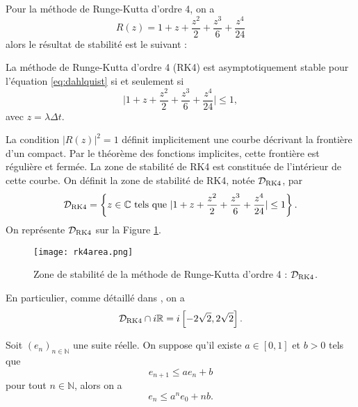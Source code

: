Pour la méthode de Runge-Kutta d'ordre 4, on a 
\begin{equation}
R(z) = 1 + z + \dfrac{z^2}{2} + \dfrac{z^3}{6} + \dfrac{z^4}{24} 
\label{eq:pol_RK4}
\end{equation}
alors le résultat de stabilité est le suivant :
\begin{proposition}
La méthode de Runge-Kutta d'ordre 4 (RK4) est asymptotiquement stable pour l'équation \eqref{eq:dahlquist} si et seulement si
\begin{equation}
\vert 1 + z + \dfrac{z^2}{2} + \dfrac{z^3}{6} + \dfrac{z^4}{24}  \vert \leq 1,
\end{equation}
avec $z = \lambda \Delta t$.
\label{prop:stab_rk4}
\end{proposition}
La condition $|R(z)|^2 = 1$ définit implicitement une courbe décrivant la frontière d'un compact. Par le théorème des fonctions implicites, cette frontière est régulière et fermée. La zone de stabilité de RK4 est constituée de l'intérieur de cette courbe.
On définit la zone de stabilité de RK4, notée $\mathcal{D}_{\RK4}$, par
\begin{equation}
\mathcal{D}_{\RK4} = \left\lbrace z \in \mathbb{C} \text{ tels que } \vert 1 + z + \dfrac{z^2}{2} + \dfrac{z^3}{6} + \dfrac{z^4}{24}  \vert \leq 1 \right\rbrace .
\end{equation} 
On représente $\mathcal{D}_{\RK4}$ sur la Figure \ref{fig:stab_area}.
\begin{figure}[htbp]
\begin{center}
\texttt{[image: rk4area.png]}
\end{center}
\caption{Zone de stabilité de la méthode de Runge-Kutta d'ordre 4 : $\mathcal{D}_{\RK4}$.}
\label{fig:stab_area}
\end{figure}

En particulier, comme détaillé dans \cite{Hundsdorfer2013}, on a
\begin{equation}
\mathcal{D}_{\RK4} \cap i \mathbb{R} = i \left[-2 \sqrt{2},2 \sqrt{2}\right].
\label{eq:DRK4UiR}
\end{equation}

\begin{lemme}
Soit $(e_n)_{n \in \mathbb{N}}$ une suite réelle. On suppose qu'il existe $a \in [0,1]$ et $b>0$ tels que
\begin{equation}
e_{n+1} \leq a e_n + b 
\end{equation}
pour tout $n \in \mathbb{N}$, alors on a
\begin{equation}
e_n \leq a^n e_0 + nb.
\end{equation}
\label{lem:gronwall_discret}
\end{lemme}

